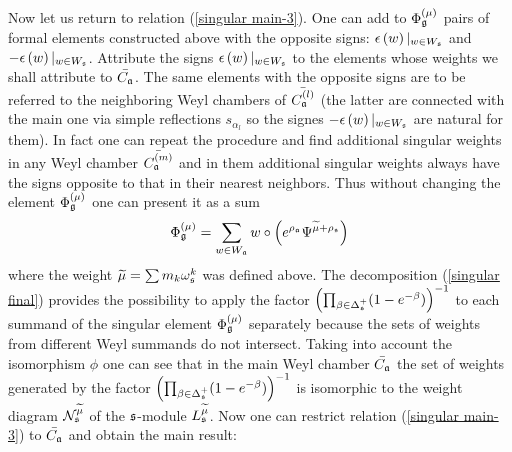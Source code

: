 Now let us return to relation (\ref{singular main-3}). One can add to $%
\Phi _{\gf}^{\left( \mu \right) }$ pairs of formal elements
constructed above  with the opposite signs: $\epsilon \left( w\right)
|_{w\in W_{\frak{s}}}$ and $-\epsilon \left( w\right) |_{w\in W_{\frak{s}}}$. 
Attribute the signs $\epsilon \left( w\right) |_{w\in W_{\frak{s}}}$ to
the elements whose weights we shall attribute to $\bar{C_{\mathfrak{a}}}$. 
The same elements with the opposite signs are to be referred to the
neighboring Weyl chambers of $\bar{C_{\mathfrak{a}}^{(l)}}$ (the latter are
connected with the main one via simple reflections $s_{\alpha _{l}}$ so the
signes $-\epsilon \left( w\right) |_{w\in W_{\frak{s}}}$ are natural for
them). In fact one can repeat the procedure and find additional singular
weights in any Weyl chamber $\bar{C_{\mathfrak{a}}^{(m)}}$ and in them
additional singular weights always have the signs opposite to that in their
nearest neighbors. Thus without changing the element $\Phi _{\gf%
}^{\left( \mu \right) }$ one can present it as a sum
\begin{equation}
\Phi _{\mathfrak{g}}^{\left( \mu \right) }=\sum_{w\in W_{\mathfrak{a}}}w\circ \left(
e^{\rho _{\mathfrak{a}}}\Psi ^{\widetilde{\mu }+\rho _{\frak{s}}}\right)
\label{singular final}
\end{equation}
where the weight $\widetilde{\mu }=\sum m_{k}\omega _{\frak{s}}^{k}$ was
defined above. The decomposition (\ref{singular final}) provides the
possibility to apply the factor $\left( \prod_{\beta \in \Delta _{\frak{s}%
}^{+}}(1-e^{-\beta })\right) ^{-1}$ to each summand of the singular element $%
\Phi _{\gf}^{\left( \mu \right) }$ separately because the sets of
weights from different Weyl summands do not intersect. Taking into account
the isomorphism $\phi $ one can see that in the main Weyl chamber $\bar{C_{%
\af}}$ the set of weights generated by the factor $\left( \prod_{\beta
\in \Delta _{\frak{s}}^{+}}(1-e^{-\beta })\right) ^{-1}$ is isomorphic to
the weight diagram $\mathcal{N}_{\frak{s}}^{\widetilde{\mu }}$ of the $\frak{%
s}$-module $L_{\frak{s}}^{\widetilde{\mu }}$. Now one can restrict
relation (\ref{singular main-3}) to $\bar{C_{\mathfrak{a}}}$ and obtain the main
result:
